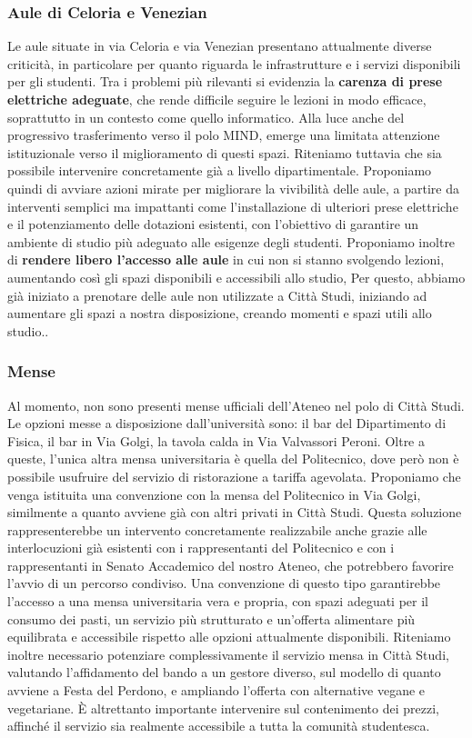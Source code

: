 \documentclass[12pt,a4paper]{article}
\begin{document}
\subsubsection{Aule di Celoria e Venezian}
Le aule situate in via Celoria e via Venezian presentano attualmente diverse criticità, in particolare per quanto riguarda le infrastrutture e i servizi disponibili per gli studenti. Tra i problemi più rilevanti si evidenzia la \textbf{carenza di prese elettriche adeguate}, che rende difficile seguire le lezioni in modo efficace, soprattutto in un contesto come quello informatico.
Alla luce anche del progressivo trasferimento verso il polo MIND, emerge una limitata attenzione istituzionale verso il miglioramento di questi spazi. Riteniamo tuttavia che sia possibile intervenire concretamente già a livello dipartimentale.
Proponiamo quindi di avviare azioni mirate per migliorare la vivibilità delle aule, a partire da interventi semplici ma impattanti come l’installazione di ulteriori prese elettriche e il potenziamento delle dotazioni esistenti, con l’obiettivo di garantire un ambiente di studio più adeguato alle esigenze degli studenti.
Proponiamo inoltre di \textbf{rendere libero l'accesso alle aule} in cui non si stanno svolgendo lezioni, aumentando così gli spazi disponibili e accessibili allo studio, Per questo, abbiamo già iniziato a prenotare delle aule non utilizzate a Città Studi, iniziando ad aumentare gli spazi a nostra disposizione, creando momenti e spazi utili allo studio..

\subsubsection{Mense}
Al momento, non sono presenti mense ufficiali dell'Ateneo nel polo di Città Studi. Le opzioni messe a disposizione dall'università sono:
il bar del Dipartimento di Fisica, il bar in Via Golgi, la tavola calda in Via Valvassori Peroni. Oltre a queste, l'unica altra mensa universitaria è quella del Politecnico, dove però non è possibile usufruire del servizio di ristorazione a tariffa agevolata.
Proponiamo che venga istituita una convenzione con la mensa del Politecnico in Via Golgi, similmente a quanto avviene già con altri privati in Città Studi. Questa soluzione rappresenterebbe un intervento concretamente realizzabile anche grazie alle interlocuzioni già esistenti con i rappresentanti del Politecnico e con i rappresentanti in Senato Accademico del nostro Ateneo, che potrebbero favorire l’avvio di un percorso condiviso. Una convenzione di questo tipo garantirebbe l’accesso a una mensa universitaria vera e propria, con spazi adeguati per il consumo dei pasti, un servizio più strutturato e un’offerta alimentare più equilibrata e accessibile rispetto alle opzioni attualmente disponibili.
Riteniamo inoltre necessario potenziare complessivamente il servizio mensa in Città Studi, valutando l’affidamento del bando a un gestore diverso, sul modello di quanto avviene a Festa del Perdono, e ampliando l’offerta con alternative vegane e vegetariane. È altrettanto importante intervenire sul contenimento dei prezzi, affinché il servizio sia realmente accessibile a tutta la comunità studentesca.
\end{document}
